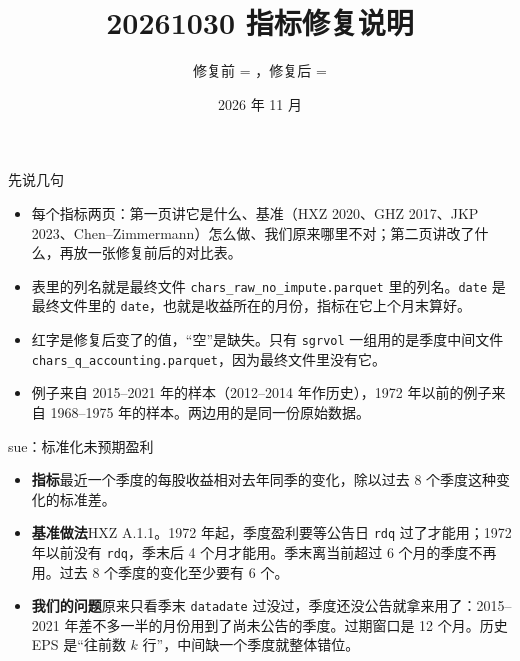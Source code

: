 \documentclass[UTF8,fontset=fandol,aspectratio=169,10pt,t]{ctexbeamer}
\title{20261030 指标修复说明}
\subtitle{修复前 = \code{main}，修复后 = \code{fix-20261030}}
\date{2026 年 11 月}
\newcommand{\chg}[1]{\textcolor{red!80!black}{#1}}
\newcommand{\kong}{空}
\newcommand{\code}[1]{\texttt{#1}}
\newcommand{\lab}[1]{\textbf{#1}\quad}
\begin{document}
\begin{frame}
\titlepage
\end{frame}

\begin{frame}{先说几句}
\begin{itemize}
\item 每个指标两页：第一页讲它是什么、基准（HXZ 2020、GHZ 2017、JKP 2023、Chen--Zimmermann）怎么做、我们原来哪里不对；第二页讲改了什么，再放一张修复前后的对比表。
\item 表里的列名就是最终文件 \code{chars\_raw\_no\_impute.parquet} 里的列名。\code{date} 是最终文件里的 \code{date}，也就是收益所在的月份，指标在它上个月末算好。
\item \chg{红字}是修复后变了的值，“\kong”是缺失。只有 \code{sgrvol} 一组用的是季度中间文件 \code{chars\_q\_accounting.parquet}，因为最终文件里没有它。
\item 例子来自 2015--2021 年的样本（2012--2014 年作历史），1972 年以前的例子来自 1968--1975 年的样本。两边用的是同一份原始数据。
\end{itemize}
\end{frame}

\begin{frame}{sue：标准化未预期盈利}
\begin{itemize}
\item \lab{指标}最近一个季度的每股收益相对去年同季的变化，除以过去 8 个季度这种变化的标准差。
\item \lab{基准做法}HXZ A.1.1。1972 年起，季度盈利要等公告日 \code{rdq} 过了才能用；1972 年以前没有 \code{rdq}，季末后 4 个月才能用。季末离当前超过 6 个月的季度不再用。过去 8 个季度的变化至少要有 6 个。
\item \lab{我们的问题}原来只看季末 \code{datadate} 过没过，季度还没公告就拿来用了：2015--2021 年差不多一半的月份用到了尚未公告的季度。过期窗口是 12 个月。历史 EPS 是“往前数 $k$ 行”，中间缺一个季度就整体错位。
\end{itemize}
\end{frame}
\end{document}
